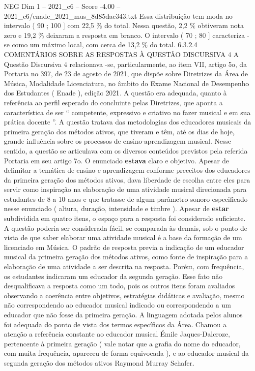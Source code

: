 \begin{textsample}{NEG Dim 1 – 2021\_c6 – Score -4.00 – 2021\_c6/enade\_2021\_mus\_8d85dac343.txt}
Essa distribuição tem moda no intervalo ( 90 ; 100 ] com 22,5 \% do total.
Nessa questão, 2,2 \% obtiveram nota zero e 19,2 \% deixaram a resposta em branco.
O intervalo ( 70 ; 80 ] caracteriza -se como um máximo local, com cerca de 13,2 \% do total. 6.3.2.4 COMENTÁRIOS SOBRE AS RESPOSTAS À QUESTÃO DISCURSIVA 4 A Questão Discursiva 4 relacionava -se, particularmente, ao item VII, artigo 5o, da Portaria no 397, de 23 de agosto de 2021, que dispõe sobre Diretrizes da Área de Música, Modalidade Licenciatura, no âmbito do Exame Nacional de Desempenho dos Estudantes ( Enade ), edição 2021.
A questão era adequada, quanto à referência ao perfil esperado do concluinte pelas Diretrizes, que aponta a característica de ser “ competente, expressivo e criativo no fazer musical e em sua prática docente ”.
A questão tratava das metodologias dos educadores musicais da primeira geração dos métodos ativos, que tiveram e têm, até os dias de hoje, grande influência sobre os processos de ensino-aprendizagem musical.
Nesse sentido, a questão se articulava com os diversos conteúdos previstos pela referida Portaria em seu artigo 7o.
O enunciado \textbf{estava} claro e objetivo.
Apesar de delimitar a temática de ensino e aprendizagem conforme preceitos dos educadores da primeira geração dos métodos ativos, dava liberdade de escolha entre eles para servir como inspiração na elaboração de uma atividade musical direcionada para estudantes de 8 a 10 anos e que tratasse de algum parâmetro sonoro especificado nesse enunciado ( altura, duração, intensidade e timbre ).
Apesar de \textbf{estar} subdividida em quatro itens, o espaço para a resposta foi considerado suficiente.
A questão poderia ser considerada fácil, se comparada às demais, sob o ponto de vista de que saber elaborar uma atividade musical é a base da formação de um licenciado em Música.
O padrão de resposta previa a indicação de um educador musical da primeira geração dos métodos ativos, como fonte de inspiração para a elaboração de uma atividade a ser descrita na resposta.
Porém, com frequência, os estudantes indicaram um educador da segunda geração.
Esse fato não desqualificava a resposta como um todo, pois os outros itens foram avaliados observando a coerência entre objetivos, estratégias didáticas e avaliação, mesmo não correspondendo ao educador musical indicado ou correspondendo a um educador que não fosse da primeira geração.
A linguagem adotada pelos alunos foi adequada do ponto de vista dos termos específicos da Área.
Chamou a atenção a referência constante ao educador musical Émile Jaques-Dalcroze, pertencente à primeira geração ( vale notar que a grafia do nome do educador, com muita frequência, apareceu de forma equivocada ), e ao educador musical da segunda geração dos métodos ativos Raymond Murray Schafer.

\end{textsample}
